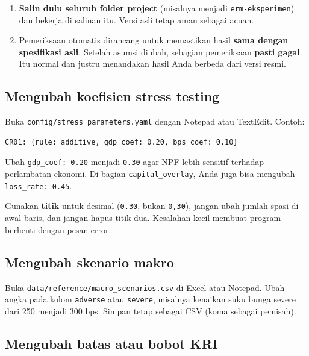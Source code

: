 \documentclass[11pt,a4paper]{article}
\newcommand{\file}[1]{\texttt{\small #1}}
\begin{document}
\begin{warnbox}
\begin{enumerate}
\item \textbf{Salin dulu seluruh folder project} (misalnya menjadi \file{erm-eksperimen}) dan bekerja di salinan itu. Versi asli tetap aman sebagai acuan.
\item Pemeriksaan otomatis dirancang untuk memastikan hasil \textbf{sama dengan spesifikasi asli}. Setelah asumsi diubah, sebagian pemeriksaan \textbf{pasti gagal}. Itu normal dan justru menandakan hasil Anda berbeda dari versi resmi.
\end{enumerate}
\end{warnbox}

\subsection{Mengubah koefisien stress testing}

Buka \file{config/stress\_\allowbreak{}parameters.yaml} dengan Notepad atau TextEdit. Contoh:
\begin{lstlisting}
CR01: {rule: additive, gdp_coef: 0.20, bps_coef: 0.10}
\end{lstlisting}
Ubah \texttt{gdp\_\allowbreak{}coef: 0.20} menjadi \texttt{0.30} agar NPF lebih sensitif terhadap perlambatan ekonomi. Di bagian \texttt{capital\_\allowbreak{}overlay}, Anda juga bisa mengubah \texttt{loss\_\allowbreak{}rate: 0.45}.

\begin{warnbox}
Gunakan \textbf{titik} untuk desimal (\texttt{0.30}, bukan \texttt{0,30}), jangan ubah jumlah spasi di awal baris, dan jangan hapus titik dua. Kesalahan kecil membuat program berhenti dengan pesan error.
\end{warnbox}

\subsection{Mengubah skenario makro}

Buka \file{data/reference/macro\_\allowbreak{}scenarios.csv} di Excel atau Notepad. Ubah angka pada kolom \texttt{adverse} atau \texttt{severe}, misalnya kenaikan suku bunga severe dari 250 menjadi 300 bps. Simpan tetap sebagai CSV (koma sebagai pemisah).

\subsection{Mengubah batas atau bobot KRI}
\end{document}
